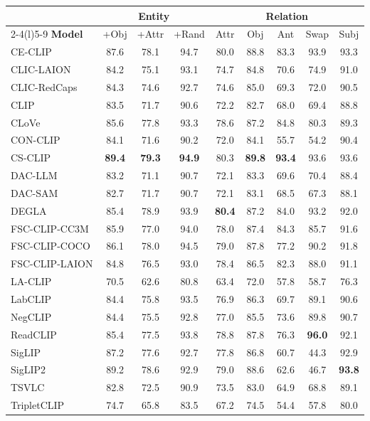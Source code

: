 \begin{tabular}{@{}lccc|ccccc@{}}
\toprule
& \multicolumn{3}{c|}{\textbf{Entity}} & \multicolumn{5}{c}{\textbf{Relation}} \\
\cmidrule(r){2-4}\cmidrule(l){5-9}
\textbf{Model} & +Obj & +Attr & +Rand & Attr & Obj & Ant & Swap & Subj \\
\midrule
CE-CLIP & 87.6 & 78.1 & 94.7 & 80.0 & 88.8 & 83.3 & 93.9 & 93.3 \\
CLIC-LAION & 84.2 & 75.1 & 93.1 & 74.7 & 84.8 & 70.6 & 74.9 & 91.0 \\
CLIC-RedCaps & 84.3 & 74.6 & 92.7 & 74.6 & 85.0 & 69.3 & 72.0 & 90.5 \\
CLIP & 83.5 & 71.7 & 90.6 & 72.2 & 82.7 & 68.0 & 69.4 & 88.8 \\
CLoVe & 85.6 & 77.8 & 93.3 & 78.6 & 87.2 & 84.8 & 80.3 & 89.3 \\
CON-CLIP & 84.1 & 71.6 & 90.2 & 72.0 & 84.1 & 55.7 & 54.2 & 90.4 \\
CS-CLIP & \textbf{89.4} & \textbf{79.3} & \textbf{94.9} & 80.3 & \textbf{89.8} & \textbf{93.4} & 93.6 & 93.6 \\
DAC-LLM & 83.2 & 71.1 & 90.7 & 72.1 & 83.3 & 69.6 & 70.4 & 88.4 \\
DAC-SAM & 82.7 & 71.7 & 90.7 & 72.1 & 83.1 & 68.5 & 67.3 & 88.1 \\
DEGLA & 85.4 & 78.9 & 93.9 & \textbf{80.4} & 87.2 & 84.0 & 93.2 & 92.0 \\
FSC-CLIP-CC3M & 85.9 & 77.0 & 94.0 & 78.0 & 87.4 & 84.3 & 85.7 & 91.6 \\
FSC-CLIP-COCO & 86.1 & 78.0 & 94.5 & 79.0 & 87.8 & 77.2 & 90.2 & 91.8 \\
FSC-CLIP-LAION & 84.8 & 76.5 & 93.0 & 78.4 & 86.5 & 82.3 & 88.0 & 91.1 \\
LA-CLIP & 70.5 & 62.6 & 80.8 & 63.4 & 72.0 & 57.8 & 58.7 & 76.3 \\
LabCLIP & 84.4 & 75.8 & 93.5 & 76.9 & 86.3 & 69.7 & 89.1 & 90.6 \\
NegCLIP & 84.4 & 75.5 & 92.8 & 77.0 & 85.5 & 73.6 & 89.8 & 90.7 \\
ReadCLIP & 85.4 & 77.5 & 93.8 & 78.8 & 87.8 & 76.3 & \textbf{96.0} & 92.1 \\
SigLIP & 87.2 & 77.6 & 92.7 & 77.8 & 86.8 & 60.7 & 44.3 & 92.9 \\
SigLIP2 & 89.2 & 78.6 & 92.9 & 79.0 & 88.6 & 62.6 & 46.7 & \textbf{93.8} \\
TSVLC & 82.8 & 72.5 & 90.9 & 73.5 & 83.0 & 64.9 & 68.8 & 89.1 \\
TripletCLIP & 74.7 & 65.8 & 83.5 & 67.2 & 74.5 & 54.4 & 57.8 & 80.0 \\
\bottomrule
\end{tabular}